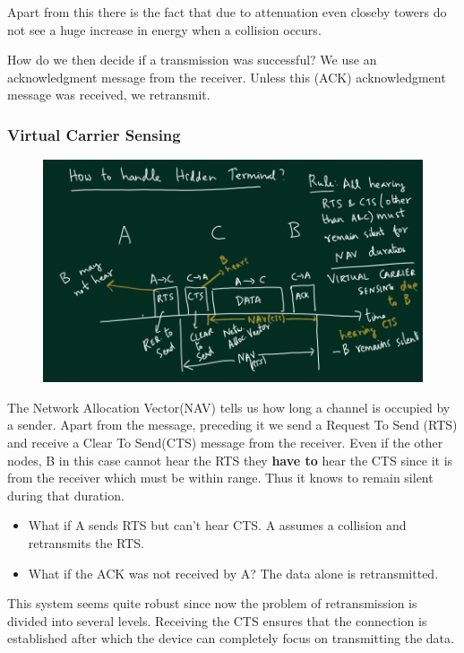 \documentclass[12pt]{article}
\begin{document}
Apart from this there is the fact that due to attenuation even closeby towers do not 
see a huge increase in energy when a collision occurs. 


How do we then decide if a transmission was successful? We use an acknowledgment message from the receiver. 
Unless this (ACK) acknowledgment message was received, we retransmit. 

\subsubsection{Virtual Carrier Sensing}

\begin{figure}[H]
    \centering
    \includegraphics*[width=15cm]{Diagrams/hidden_terminal.png}
\end{figure}

The Network Allocation Vector(NAV) tells us how long a channel is occupied by a sender. 
Apart from the message, preceding it we send a Request To Send (RTS) and receive a Clear To Send(CTS) message from the 
receiver. Even if the other nodes, B in this case cannot hear the RTS they \textbf{have to} hear the CTS since it is from the 
receiver which must be within range. Thus it knows to remain silent during that duration. 

\begin{itemize}
    \item What if A sends RTS but can't hear CTS. A assumes a collision and retransmits the RTS. 
    \item What if the ACK was not received by A? The data alone is retransmitted. 
\end{itemize}

This system seems quite robust since now the problem of retransmission is divided into several levels. Receiving the 
CTS ensures that the connection is established after which the device can completely focus on transmitting the data. 
\end{document}
